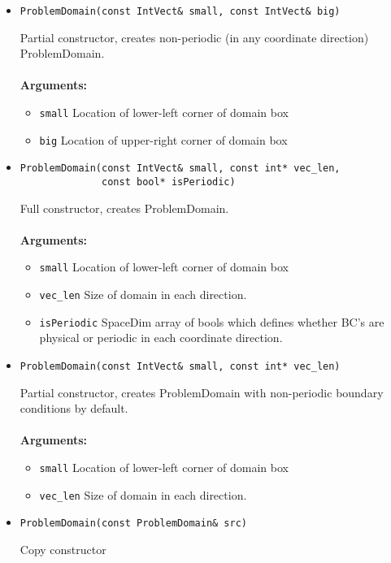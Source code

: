 \begin{itemize}
\item
\begin{verbatim}
ProblemDomain(const IntVect& small, const IntVect& big)
\end{verbatim}
Partial constructor, creates non-periodic (in any coordinate
direction) ProblemDomain. \\
\\
{\bf Arguments:}
\begin{itemize}
\item \verb/small/ Location of lower-left corner of domain box
\item \verb/big/  Location of upper-right corner of domain box
\end{itemize}

\item
\begin{verbatim}
ProblemDomain(const IntVect& small, const int* vec_len,
              const bool* isPeriodic)
\end{verbatim}
Full constructor, creates ProblemDomain. \\
\\
{\bf Arguments:}
\begin{itemize}
\item \verb/small/ Location of lower-left corner of domain box
\item \verb/vec_len/ Size of domain in each direction.
\item  \verb/isPeriodic/ SpaceDim array of bools which defines
whether BC's are physical or periodic in each coordinate direction.   
\end{itemize}

\item
\begin{verbatim}
ProblemDomain(const IntVect& small, const int* vec_len)
\end{verbatim}
Partial constructor, creates ProblemDomain with non-periodic boundary
conditions by default. \\
\\
{\bf Arguments:}
\begin{itemize}
\item \verb/small/ Location of lower-left corner of domain box
\item \verb/vec_len/ Size of domain in each direction.
\end{itemize}


\item
\begin{verbatim}
ProblemDomain(const ProblemDomain& src)
\end{verbatim}
Copy  constructor  



\end{itemize}
